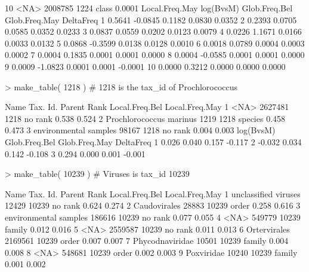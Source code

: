 \documentclass{article}
\begin{document}
\begin{Schunk}
\begin{Soutput}
10                        <NA>  2008785   1224     class         0.0001
   Local.Freq.May log(BvsM) Glob.Freq.Bel Glob.Freq.May DeltaFreq
1          0.5641   -0.0845        0.1182        0.0830    0.0352
2          0.2393    0.0705        0.0585        0.0352    0.0233
3          0.0837    0.0559        0.0202        0.0123    0.0079
4          0.0226    1.1671        0.0166        0.0033    0.0132
5          0.0868   -0.3599        0.0138        0.0128    0.0010
6          0.0018    0.0789        0.0004        0.0003    0.0002
7          0.0004    0.1835        0.0001        0.0001    0.0000
8          0.0004   -0.0585        0.0001        0.0001    0.0000
9          0.0009   -1.0823        0.0001        0.0001   -0.0001
10         0.0000    0.3212        0.0000        0.0000    0.0000
\end{Soutput}
\begin{Sinput}
> make_table( 1218 )   # 1218 is the tax_id of Prochlorococcus
\end{Sinput}
\begin{Soutput}
                     Name Tax. Id. Parent    Rank Local.Freq.Bel Local.Freq.May
1                    <NA>  2627481   1218 no rank          0.538          0.524
2 Prochlorococcus marinus     1219   1218 species          0.458          0.473
3   environmental samples    98167   1218 no rank          0.004          0.003
  log(BvsM) Glob.Freq.Bel Glob.Freq.May DeltaFreq
1     0.026         0.040         0.157    -0.117
2    -0.032         0.034         0.142    -0.108
3     0.294         0.000         0.001    -0.001
\end{Soutput}
\begin{Sinput}
> make_table( 10239 )  # Viruses is tax_id 10239
\end{Sinput}
\begin{Soutput}
                    Name Tax. Id. Parent    Rank Local.Freq.Bel Local.Freq.May
1   unclassified viruses    12429  10239 no rank          0.624          0.274
2           Caudovirales    28883  10239   order          0.258          0.616
3  environmental samples   186616  10239 no rank          0.077          0.055
4                   <NA>   549779  10239  family          0.012          0.016
5                   <NA>  2559587  10239 no rank          0.011          0.013
6           Ortervirales  2169561  10239   order          0.007          0.007
7        Phycodnaviridae    10501  10239  family          0.004          0.008
8                   <NA>   548681  10239   order          0.002          0.003
9             Poxviridae    10240  10239  family          0.001          0.002

\end{Soutput}
\end{Schunk}
\end{document}
